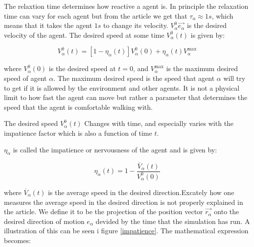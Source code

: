The relaxtion time determines how reactive a agent is. In principle the 
relaxation time can vary for each agent but from the article \cite{self-org} 
we get that $ \tau_{\alpha}\approx 1s $, which means that it takes the agent $ 
1s $ to change its velocity. $V_{\alpha}^{0} \vec{e_{\alpha}}$ is the desired 
velocity of the agent. The desired speed at some time $V_{\alpha}^{0}\left( t 
\right)$ is given by:



\begin{equation}\label{v0eta}
    V_{\alpha}^{0}\left( t \right) = \left[ 1 - \eta_{\alpha} \left( t \right) \right] 
    V_{\alpha}^{0} \left( 0 \right) +
    \eta_{\alpha} \left( t \right)V_{\alpha}^{\text{max}}
\end{equation}

where $V_{\alpha}^{0} \left( 0 \right)$ is the desired speed at $ t=0 $, and 
$V_{\alpha}^{\text{max}}$ is the maximum desired speed of agent $\alpha$. The 
maximum desired speed is the speed that agent $\alpha$ will try to get if it 
is allowed by the environment and other agents. It is not a physical limit to 
how fast the agent can move but rather a parameter that determines the speed 
that the agent is comfortable walking with. 

The desired speed $V_{\alpha}^{0} \left( t \right)$ Changes with time, and 
especially varies with the impatience factor which is also a function of time 
$t$.

$\eta_{\alpha}$ is called the impatience or nervousness of the agent and is 
given by:

\begin{equation}\label{eta}
	\eta_{\alpha} \left( t \right) =
    1 - \frac{\overline{V}_{\alpha} \left( t \right)}
             {V_{\alpha}^{0} \left( 0 \right)}
\end{equation}

where $\overline{V}_{\alpha}\left( t \right)$ is the average speed in the 
desired direction.Excately how one measures the average speed in the desired 
direction is not properly explained in the article. We define it to be the 
projection of the position vector $ \vec{r_{\alpha}} $ onto the desired direction 
of motion $e_{\alpha}$ devided by the time that the simulation has run. A 
illustration of this can be seen i figure \ref{impatience}. The mathematical 
expression becomes:


